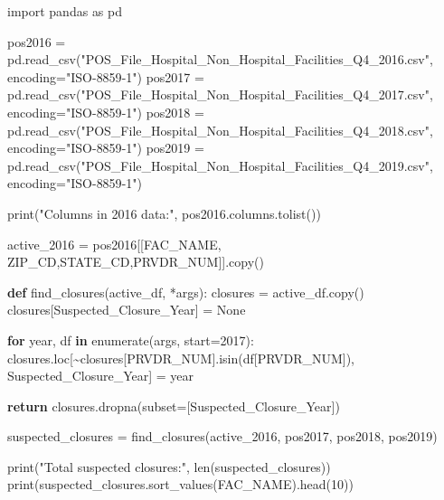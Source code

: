 \documentclass[
  letterpaper,
  DIV=11,
  numbers=noendperiod]{scrartcl}
\newenvironment{Shaded}{\begin{snugshade}}{\end{snugshade}}
\newcommand{\BuiltInTok}[1]{\textcolor[rgb]{0.00,0.23,0.31}{#1}}
\newcommand{\ControlFlowTok}[1]{\textcolor[rgb]{0.00,0.23,0.31}{\textbf{#1}}}
\newcommand{\DecValTok}[1]{\textcolor[rgb]{0.68,0.00,0.00}{#1}}
\newcommand{\ImportTok}[1]{\textcolor[rgb]{0.00,0.46,0.62}{#1}}
\newcommand{\KeywordTok}[1]{\textcolor[rgb]{0.00,0.23,0.31}{\textbf{#1}}}
\newcommand{\NormalTok}[1]{\textcolor[rgb]{0.00,0.23,0.31}{#1}}
\newcommand{\OperatorTok}[1]{\textcolor[rgb]{0.37,0.37,0.37}{#1}}
\newcommand{\StringTok}[1]{\textcolor[rgb]{0.13,0.47,0.30}{#1}}
\newcommand{\VariableTok}[1]{\textcolor[rgb]{0.07,0.07,0.07}{#1}}
\begin{document}
\begin{Shaded}
\begin{Highlighting}[]
\ImportTok{import}\NormalTok{ pandas }\ImportTok{as}\NormalTok{ pd}

\NormalTok{pos2016 }\OperatorTok{=}\NormalTok{ pd.read\_csv(}\StringTok{"POS\_File\_Hospital\_Non\_Hospital\_Facilities\_Q4\_2016.csv"}\NormalTok{, encoding}\OperatorTok{=}\StringTok{"ISO{-}8859{-}1"}\NormalTok{)}
\NormalTok{pos2017 }\OperatorTok{=}\NormalTok{ pd.read\_csv(}\StringTok{"POS\_File\_Hospital\_Non\_Hospital\_Facilities\_Q4\_2017.csv"}\NormalTok{, encoding}\OperatorTok{=}\StringTok{"ISO{-}8859{-}1"}\NormalTok{)}
\NormalTok{pos2018 }\OperatorTok{=}\NormalTok{ pd.read\_csv(}\StringTok{"POS\_File\_Hospital\_Non\_Hospital\_Facilities\_Q4\_2018.csv"}\NormalTok{, encoding}\OperatorTok{=}\StringTok{"ISO{-}8859{-}1"}\NormalTok{)}
\NormalTok{pos2019 }\OperatorTok{=}\NormalTok{ pd.read\_csv(}\StringTok{"POS\_File\_Hospital\_Non\_Hospital\_Facilities\_Q4\_2019.csv"}\NormalTok{, encoding}\OperatorTok{=}\StringTok{"ISO{-}8859{-}1"}\NormalTok{)}

\BuiltInTok{print}\NormalTok{(}\StringTok{"Columns in 2016 data:"}\NormalTok{, pos2016.columns.tolist())}

\NormalTok{active\_2016 }\OperatorTok{=}\NormalTok{ pos2016[[}\StringTok{\textquotesingle{}FAC\_NAME\textquotesingle{}}\NormalTok{, }\StringTok{\textquotesingle{}ZIP\_CD\textquotesingle{}}\NormalTok{,}\StringTok{\textquotesingle{}STATE\_CD\textquotesingle{}}\NormalTok{,}\StringTok{\textquotesingle{}PRVDR\_NUM\textquotesingle{}}\NormalTok{]].copy()}

\KeywordTok{def}\NormalTok{ find\_closures(active\_df, }\OperatorTok{*}\NormalTok{args):}
\NormalTok{    closures }\OperatorTok{=}\NormalTok{ active\_df.copy()}
\NormalTok{    closures[}\StringTok{\textquotesingle{}Suspected\_Closure\_Year\textquotesingle{}}\NormalTok{] }\OperatorTok{=} \VariableTok{None}

    \ControlFlowTok{for}\NormalTok{ year, df }\KeywordTok{in} \BuiltInTok{enumerate}\NormalTok{(args, start}\OperatorTok{=}\DecValTok{2017}\NormalTok{):}
\NormalTok{        closures.loc[}\OperatorTok{\textasciitilde{}}\NormalTok{closures[}\StringTok{\textquotesingle{}PRVDR\_NUM\textquotesingle{}}\NormalTok{].isin(df[}\StringTok{\textquotesingle{}PRVDR\_NUM\textquotesingle{}}\NormalTok{]), }\StringTok{\textquotesingle{}Suspected\_Closure\_Year\textquotesingle{}}\NormalTok{] }\OperatorTok{=}\NormalTok{ year}

    \ControlFlowTok{return}\NormalTok{ closures.dropna(subset}\OperatorTok{=}\NormalTok{[}\StringTok{\textquotesingle{}Suspected\_Closure\_Year\textquotesingle{}}\NormalTok{])}

\NormalTok{suspected\_closures }\OperatorTok{=}\NormalTok{ find\_closures(active\_2016, pos2017, pos2018, pos2019)}

\BuiltInTok{print}\NormalTok{(}\StringTok{"Total suspected closures:"}\NormalTok{, }\BuiltInTok{len}\NormalTok{(suspected\_closures))}
\BuiltInTok{print}\NormalTok{(suspected\_closures.sort\_values(}\StringTok{\textquotesingle{}FAC\_NAME\textquotesingle{}}\NormalTok{).head(}\DecValTok{10}\NormalTok{))}
\end{Highlighting}
\end{Shaded}
\end{document}
